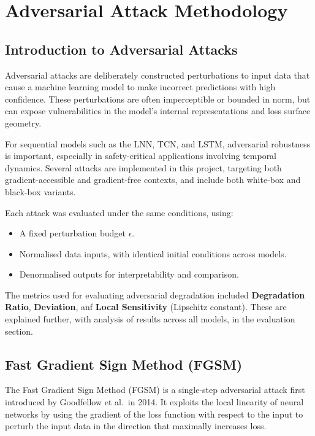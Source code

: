 \chapter{Adversarial Attack Methodology}

\section{Introduction to Adversarial Attacks}

Adversarial attacks are deliberately constructed perturbations to input data that cause a machine learning model to make incorrect predictions with high confidence. These perturbations are often imperceptible or bounded in norm, but can expose vulnerabilities in the model's internal representations and loss surface geometry.

For sequential models such as the LNN, TCN, and LSTM, adversarial robustness is important, especially in safety-critical applications involving temporal dynamics. Several attacks are implemented in this project, targeting both gradient-accessible and gradient-free contexts, and include both white-box and black-box variants.

Each attack was evaluated under the same conditions, using:
\begin{itemize}
    \item A fixed perturbation budget $\epsilon$.
    \item Normalised data inputs, with identical initial conditions across models.
    \item Denormalised outputs for interpretability and comparison.
\end{itemize}

\noindent The metrics used for evaluating adversarial degradation included \textbf{Degradation Ratio}, \textbf{Deviation}, anf \textbf{Local Sensitivity} (Lipschitz constant). These are explained further, with analysis of results across all models, in the evaluation section.

\section{Fast Gradient Sign Method (FGSM)}

The Fast Gradient Sign Method (FGSM) is a single-step adversarial attack first introduced by Goodfellow et al.\ in 2014. It exploits the local linearity of neural networks by using the gradient of the loss function with respect to the input to perturb the input data in the direction that maximally increases loss.

